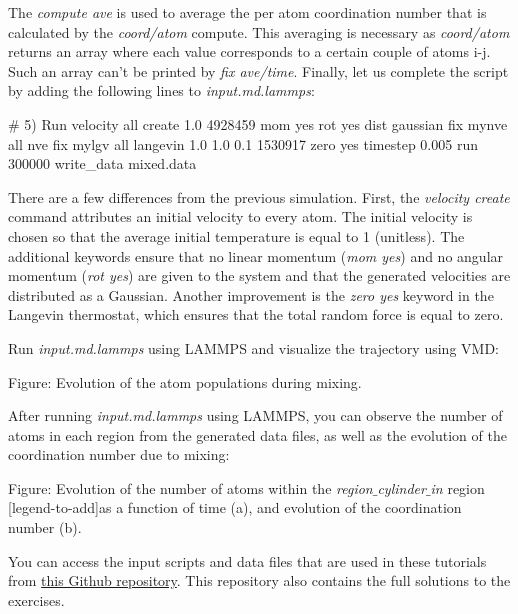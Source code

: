 \noindent The \textit{compute ave} is used to average the per atom
coordination number that is calculated by the \textit{coord/atom} compute.
This averaging is necessary as \textit{coord/atom} returns an array where each value corresponds 
to a certain couple of atoms i-j. Such an array can't be printed by \textit{fix ave/time}. 
Finally, let us complete the script by adding the following lines 
to \textit{input.md.lammps}:

\begin{lcverbatim}
# 5) Run
velocity all create 1.0 4928459 mom yes rot yes dist gaussian
fix mynve all nve
fix mylgv all langevin 1.0 1.0 0.1 1530917 zero yes
timestep 0.005
run 300000
write_data mixed.data
\end{lcverbatim}

\noindent There are a few differences from the previous simulation.
First, the \textit{velocity create}
command attributes an initial velocity to every atom.
The initial velocity is chosen so that the average initial
temperature is equal to 1 (unitless). The additional
keywords ensure that no linear momentum (\textit{mom yes}) and no angular
momentum (\textit{rot yes}) are given to the system and that the generated
velocities are distributed as a Gaussian. Another improvement
is the \textit{zero yes} keyword in the Langevin thermostat, which
ensures that the total random force is equal to zero.

\vspace{0.25cm} \noindent Run \textit{input.md.lammps} using LAMMPS and visualize the trajectory
using VMD:

\vspace{0.25cm} Figure: Evolution of the atom populations during mixing.

\vspace{0.25cm} \noindent After running \textit{input.md.lammps} using LAMMPS, you can observe the number
of atoms in each region from the generated data files, as
well as the evolution of the coordination number due to mixing:

\vspace{0.25cm} Figure: Evolution of the number of atoms within the \textit{region$\_$cylinder$\_$in} region
[legend-to-add]as a function of time (a), and evolution of the coordination number (b). 

\vspace{0.25cm} \noindent You can access the input scripts and data files that
are used in these tutorials from \href{https://github.com/lammpstutorials/lammpstutorials-inputs/}{this Github repository}.
This repository also contains the full solutions to the exercises.

